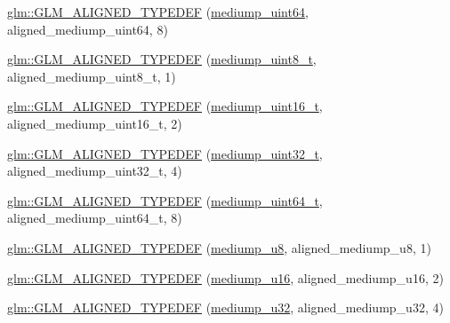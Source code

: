 \begin{DoxyCompactItemize}
\hyperlink{group__gtx__type__aligned_ga7b66a97a8acaa35c5a377b947318c6bc}{glm\+::\+G\+L\+M\+\_\+\+A\+L\+I\+G\+N\+E\+D\+\_\+\+T\+Y\+P\+E\+D\+EF} (\hyperlink{group__gtc__type__precision_ga6685788d15d0a973ee7c2460d0456dc1}{mediump\+\_\+uint64}, aligned\+\_\+mediump\+\_\+uint64, 8)
\item 
\hyperlink{group__gtx__type__aligned_gaa9cde002439b74fa66120a16a9f55fcc}{glm\+::\+G\+L\+M\+\_\+\+A\+L\+I\+G\+N\+E\+D\+\_\+\+T\+Y\+P\+E\+D\+EF} (\hyperlink{group__gtc__type__precision_gadfa38f3c245d371c4b2079f1fd68928b}{mediump\+\_\+uint8\+\_\+t}, aligned\+\_\+mediump\+\_\+uint8\+\_\+t, 1)
\item 
\hyperlink{group__gtx__type__aligned_ga1ca98c67f7d1e975f7c5202f1da1df1f}{glm\+::\+G\+L\+M\+\_\+\+A\+L\+I\+G\+N\+E\+D\+\_\+\+T\+Y\+P\+E\+D\+EF} (\hyperlink{group__gtc__type__precision_ga0b385466deac5ac96061ef2cdd6db20f}{mediump\+\_\+uint16\+\_\+t}, aligned\+\_\+mediump\+\_\+uint16\+\_\+t, 2)
\item 
\hyperlink{group__gtx__type__aligned_ga1dc8bc6199d785f235576948d80a597c}{glm\+::\+G\+L\+M\+\_\+\+A\+L\+I\+G\+N\+E\+D\+\_\+\+T\+Y\+P\+E\+D\+EF} (\hyperlink{group__gtc__type__precision_gac7782c1e393f9ad47e41a177a685f287}{mediump\+\_\+uint32\+\_\+t}, aligned\+\_\+mediump\+\_\+uint32\+\_\+t, 4)
\item 
\hyperlink{group__gtx__type__aligned_gad14a0f2ec93519682b73d70b8e401d81}{glm\+::\+G\+L\+M\+\_\+\+A\+L\+I\+G\+N\+E\+D\+\_\+\+T\+Y\+P\+E\+D\+EF} (\hyperlink{group__gtc__type__precision_gaa97354d3120a6dc029a5e9563723de18}{mediump\+\_\+uint64\+\_\+t}, aligned\+\_\+mediump\+\_\+uint64\+\_\+t, 8)
\item 
\hyperlink{group__gtx__type__aligned_gada8b996eb6526dc1ead813bd49539d1b}{glm\+::\+G\+L\+M\+\_\+\+A\+L\+I\+G\+N\+E\+D\+\_\+\+T\+Y\+P\+E\+D\+EF} (\hyperlink{group__gtc__type__precision_gac04b372784392e82bd557f300c4de097}{mediump\+\_\+u8}, aligned\+\_\+mediump\+\_\+u8, 1)
\item 
\hyperlink{group__gtx__type__aligned_ga28948f6bfb52b42deb9d73ae1ea8d8b0}{glm\+::\+G\+L\+M\+\_\+\+A\+L\+I\+G\+N\+E\+D\+\_\+\+T\+Y\+P\+E\+D\+EF} (\hyperlink{group__gtc__type__precision_ga6745262ef6a6fdb8637b2387ef924828}{mediump\+\_\+u16}, aligned\+\_\+mediump\+\_\+u16, 2)
\item 
\hyperlink{group__gtx__type__aligned_gad6a7c0b5630f89d3f1c5b4ef2919bb4c}{glm\+::\+G\+L\+M\+\_\+\+A\+L\+I\+G\+N\+E\+D\+\_\+\+T\+Y\+P\+E\+D\+EF} (\hyperlink{group__gtc__type__precision_gad0c27a525045c299a92306eb4cd7c13a}{mediump\+\_\+u32}, aligned\+\_\+mediump\+\_\+u32, 4)
\item 

\end{DoxyCompactItemize}
